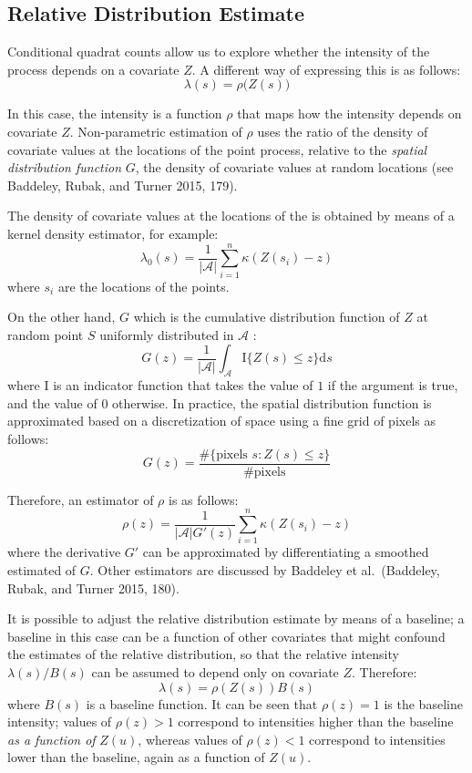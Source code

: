 \documentclass[smallextended]{svjour3}       %
\begin{document}
\hypertarget{relative-distribution-estimate}{%
\subsection{Relative Distribution
Estimate}\label{relative-distribution-estimate}}

Conditional quadrat counts allow us to explore whether the intensity of
the process depends on a covariate \(Z\). A different way of expressing
this is as follows: \[
\lambda(s)=\rho\big(Z(s)\big)
\]

In this case, the intensity is a function \(\rho\) that maps how the
intensity depends on covariate \(Z\). Non-parametric estimation of
\(\rho\) uses the ratio of the density of covariate values at the
locations of the point process, relative to the \emph{spatial
distribution function} \(G\), the density of covariate values at random
locations (see Baddeley, Rubak, and Turner 2015, 179).

The density of covariate values at the locations of the is obtained by
means of a kernel density estimator, for example: \[
\lambda_0(s) = \frac{1}{|\mathcal{A}|}\sum_{i = 1}^n\kappa(Z(s_i) - z)
\] where \(s_i\) are the locations of the points.

On the other hand, \(G\) which is the cumulative distribution function
of \(Z\) at random point \(S\) uniformly distributed in \(\mathcal{A}\)
: \[
G(z) = \frac{1}{|\mathcal{A}|} \int_{\mathcal{A}}\text{I}\{Z(s)\leq z\}\text{d}s
\] where \(\text{I}\) is an indicator function that takes the value of
\(1\) if the argument is true, and the value of \(0\) otherwise. In
practice, the spatial distribution function is approximated based on a
discretization of space using a fine grid of pixels as follows: \[
G(z) = \frac{\#\{\text{pixels }s:Z(s)\leq z\}}{\# \text{pixels}}
\]

Therefore, an estimator of \(\rho\) is as follows: \[
\rho(z) = \frac{1}{|\mathcal{A}|G'(z)}\sum_{i=1}^n\kappa(Z(s_i) - z)
\] where the derivative \(G'\) can be approximated by differentiating a
smoothed estimated of \(G\). Other estimators are discussed by Baddeley
et al.~(Baddeley, Rubak, and Turner 2015, 180).

It is possible to adjust the relative distribution estimate by means of
a baseline; a baseline in this case can be a function of other
covariates that might confound the estimates of the relative
distribution, so that the relative intensity \(\lambda(s)/B(s)\) can be
assumed to depend only on covariate \(Z\). Therefore: \[
\lambda(s) = \rho(Z(s))B(s)
\] where \(B(s)\) is a baseline function. It can be seen that
\(\rho(z)=1\) is the baseline intensity; values of \(\rho(z)>1\)
correspond to intensities higher than the baseline \emph{as a function
of} \(Z(u)\), whereas values of \(\rho(z)<1\) correspond to intensities
lower than the baseline, again as a function of \(Z(u)\).
\end{document}
